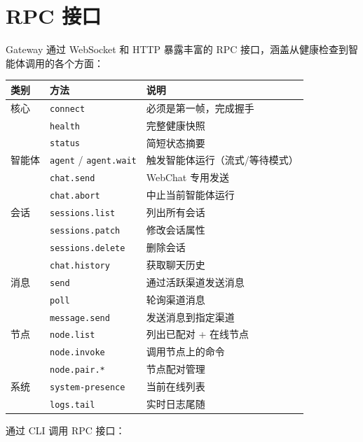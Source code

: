 \section{RPC 接口}

Gateway 通过 WebSocket 和 HTTP 暴露丰富的 RPC 接口，涵盖从健康检查到智能体调用的各个方面：

\begin{center}
\small
\begin{tabular}{llp{5.5cm}}
\toprule
\textbf{类别} & \textbf{方法} & \textbf{说明} \\
\midrule
核心 & \texttt{connect} & 必须是第一帧，完成握手 \\
     & \texttt{health} & 完整健康快照 \\
     & \texttt{status} & 简短状态摘要 \\
\midrule
智能体 & \texttt{agent} / \texttt{agent.wait} & 触发智能体运行（流式/等待模式） \\
       & \texttt{chat.send} & WebChat 专用发送 \\
       & \texttt{chat.abort} & 中止当前智能体运行 \\
\midrule
会话 & \texttt{sessions.list} & 列出所有会话 \\
     & \texttt{sessions.patch} & 修改会话属性 \\
     & \texttt{sessions.delete} & 删除会话 \\
     & \texttt{chat.history} & 获取聊天历史 \\
\midrule
消息 & \texttt{send} & 通过活跃渠道发送消息 \\
     & \texttt{poll} & 轮询渠道消息 \\
     & \texttt{message.send} & 发送消息到指定渠道 \\
\midrule
节点 & \texttt{node.list} & 列出已配对 + 在线节点 \\
     & \texttt{node.invoke} & 调用节点上的命令 \\
     & \texttt{node.pair.*} & 节点配对管理 \\
\midrule
系统 & \texttt{system-presence} & 当前在线列表 \\
     & \texttt{logs.tail} & 实时日志尾随 \\
\bottomrule
\end{tabular}
\end{center}

\noindent 通过 CLI 调用 RPC 接口：

